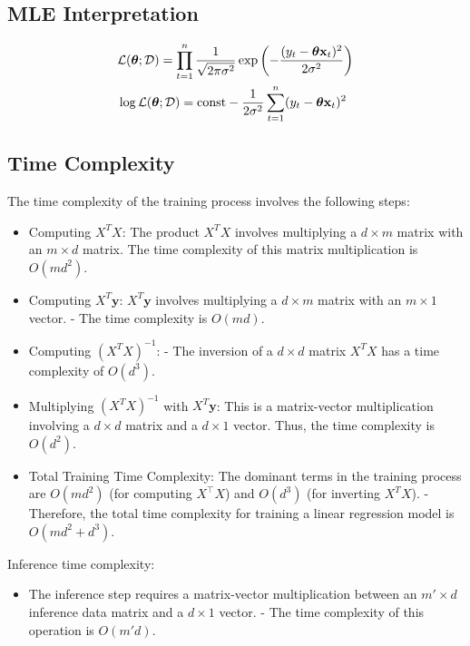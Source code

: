 \subsection{MLE Interpretation}
\begin{align*}
	&\mathcal{L}(\boldsymbol{\theta}; \mathcal{D}) = \prod_{t=1}^n \frac{1}{\sqrt{2\pi \sigma^2}} \exp \left(-\frac{(y_t-\boldsymbol{\theta}{\mathbf{x}}_t)^2}{2\sigma^2}\right)\\
	&\log \mathcal{L}(\boldsymbol{\theta}; \mathcal{D}) = \text{const} - \frac{1}{2\sigma^2}\sum_{t=1}^n(y_t-\boldsymbol{\theta}{\mathbf{x}}_t)^2
\end{align*}

\subsection{Time Complexity}
The time complexity of the training process involves the following steps:
\begin{itemize}
	\item Computing \( X^T X \): The product \( X^T X \) involves multiplying a \( d \times m \) matrix with an \( m \times d \) matrix. The time complexity of this matrix multiplication is \( O(md^2) \).
	\item Computing \( X^T \mathbf{y} \): \( X^T \mathbf{y} \) involves multiplying a \( d \times m \) matrix with an \( m \times 1 \) vector.
	 - The time complexity is \( O(md) \).
	\item Computing \( \left( X^T X \right)^{-1} \):
 - The inversion of a \( d \times d \) matrix \( X^T X \) has a time complexity of \( O(d^3) \).
	\item Multiplying \( \left( X^T X \right)^{-1} \) with \( X^T \mathbf{y} \): This is a matrix-vector multiplication involving a \( d \times d \) matrix and a \( d \times 1 \) vector. Thus, the time complexity is \( O(d^2) \).
	\item Total Training Time Complexity: The dominant terms in the training process are \( O(md^2) \) (for computing \( X^\top X \)) and \( O(d^3) \) (for inverting \( X^T X \)).
- Therefore, the total time complexity for training a linear regression model is \( O(md^2 + d^3) \).
\end{itemize}

Inference time complexity:
\begin{itemize}
	\item The inference step requires a matrix-vector multiplication between an \( m' \times d \) inference data matrix and a \( d \times 1 \) vector.
- The time complexity of this operation is \( O(m'd) \).
\end{itemize}

